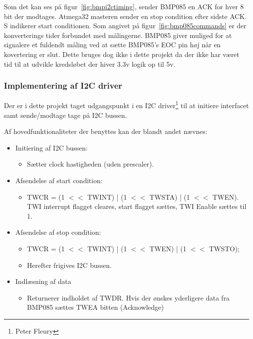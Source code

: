 Som det kan ses på figur~\ref{fig:bmpi2ctiming}, sender BMP085 en ACK for hver 8 bit der modtages. Atmega32 masteren sender en stop condition efter sidste ACK. S indikerer start conditionen.
Som angivet på figur~\ref{fig:bmp085commands} er der konverterings tider forbundet med målingerne. BMP085 giver muliged for at signalere et fuldendt måling ved at sætte BMP085’s EOC pin høj når en kovertering er slut. Dette bruges dog ikke i dette projekt da der ikke har været tid til at udvikle kredsløbet der hiver 3.3v logik op til 5v.

\subsubsection{Implementering af I2C driver}
Der er i dette projekt taget udgangspunkt i en I2C driver\footnote{Peter Fleury} til at initiere interfacet samt sende/modtage tage på I2C bussen.

Af hovedfunktionaliteter der benyttes kan der blandt andet nævnes:

\begin{itemize}
	\item Initiering af I2C bussen:
	\begin{itemize}
		\item Sætter clock hastigheden (uden prescaler).
	\end{itemize}
	
	\item Afsendelse af start condition:
	\begin{itemize}
		\item TWCR = (1 $<<$ TWINT) | (1 $<<$ TWSTA) | (1 $<<$ TWEN). TWI interrupt flagget cleares, start flagget sættes, TWI Enable sættes til 1.
	\end{itemize}
	
	\item Afsendelse af stop condition:
	\begin{itemize}
		\item TWCR = (1 $<<$ TWINT) | (1 $<<$ TWEN) | (1 $<<$ TWSTO);
		\item Herefter frigives I2C bussen.
	\end{itemize}
	
	\item Indlæsning af data
	\begin{itemize}
		\item Returnerer indholdet af TWDR. Hvis der ønskes yderligere data fra BMP085 sættes TWEA bitten (Acknowledge)
	\end{itemize}
	
\end{itemize}

